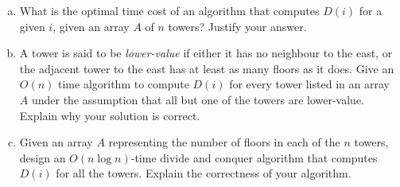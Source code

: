 \documentclass[a4paper]{article}
\begin{document}
\begin{questionbody}
\begin{enumerate}[(a), start=4]
\item What is the optimal time cost of an algorithm that computes $D(i)$ for a given $i$, given an array $A$ of $n$ towers? Justify your answer.

\item A tower is said to be \textit{lower-value} if either it has no neighbour to the east, or the adjacent tower to the east has at least as many floors as it does. Give an $O(n)$ time algorithm to compute $D(i)$ for every tower listed in an array $A$ under the assumption that all but one of the towers are lower-value. Explain why your solution is correct.

\item Given an array $A$ representing the number of floors in each of the $n$ towers, design an $O(n \log n)$-time divide and conquer algorithm that computes $D(i)$ for all the towers. Explain the correctness of your algorithm.
\end{enumerate}
\end{questionbody}

\subsection{~} %
\subsection{~} %
\subsection{~} %
\subsection{~} %
\subsection{~} %
\subsection{~} %
\subsection{~} %

\end{document}
